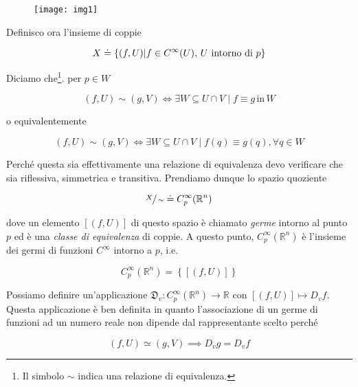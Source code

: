 \begin{figure}[H]
	\centering
	\texttt{[image: img1]}
\end{figure}

Definisco ora l'insieme di coppie

\begin{equation}
	X \doteq \left\{ (f,U) \middle| f \in C^{\infty}(U), \, \text{$ U $ intorno di $ p $} \right\}
\end{equation}

Diciamo che\footnote{%
	Il simbolo $ \sim $ indica una relazione di equivalenza.%
}. per $ p \in W $

\begin{equation}
	(f,U) \sim (g,V) \iff \exists W \subseteq U \cap V \mid f \equiv g \, \text{in} \, W
\end{equation}

o equivalentemente

\begin{equation}
	(f,U) \sim (g,V) \iff \exists W \subseteq U \cap V \mid f(q) \equiv g(q), \forall q \in W
\end{equation}

Perché questa sia effettivamente una relazione di equivalenza devo verificare che sia riflessiva, simmetrica e transitiva. Prendiamo dunque lo spazio quoziente

\begin{equation}
	\sfrac{X}{\sim} \doteq C_{p}^{\infty}(\mathbb{R}^{n})
\end{equation}

dove un elemento $ [(f,U)] $ di questo spazio è chiamato \textit{germe} intorno al punto $ p $ ed è una \textit{classe di equivalenza} di coppie. A questo punto, $ C_{p}^{\infty}(\mathbb{R}^{n}) $ è l'insieme dei germi di funzioni $ C^{\infty} $ intorno a $ p $, i.e.

\begin{equation}
	C_{p}^{\infty}(\mathbb{R}^{n}) = \left\{ [(f,U)] \right\}
\end{equation} 

Possiamo definire un'applicazione $ \mathfrak{D}_{v} : C_{p}^{\infty}(\mathbb{R}^{n}) \to \mathbb{R} $ con $ [(f,U)] \mapsto D_{v} f $. Questa applicazione è ben definita in quanto l'associazione di un germe di funzioni ad un numero reale non dipende dal rappresentante scelto perché

\begin{equation}
	(f,U) \simeq (g,V) \implies D_{v} g = D_{v} f
\end{equation}

